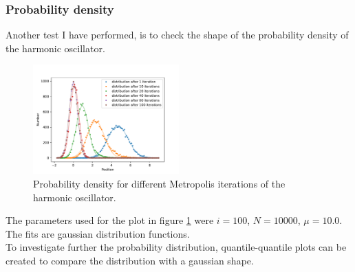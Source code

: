 \documentclass{scrartcl}
\begin{document}
	\subsubsection{Probability density}
		Another test I have performed, is to check the shape of the probability density of the harmonic oscillator.
		\begin{figure}[H]
			\centering
				\includegraphics[width=0.5\textwidth]{../imgs/harmonic_oscillator_track/track_10010000_gauss_1_fit.pdf}
			\caption{Probability density for different Metropolis iterations of the harmonic oscillator.}
			\label{fig:harmonic_oscillator_track_10010000_gauss_1_fit}
		\end{figure}
		The parameters used for the plot in figure \ref{fig:harmonic_oscillator_track_10010000_gauss_1_fit} were $i=100$, $N=10000$, $\mu = 10.0$.
		The fits are gaussian distribution functions.
		\\
		To investigate further the probability distribution, quantile-quantile plots can be created to compare the distribution with a gaussian shape.
\end{document}
